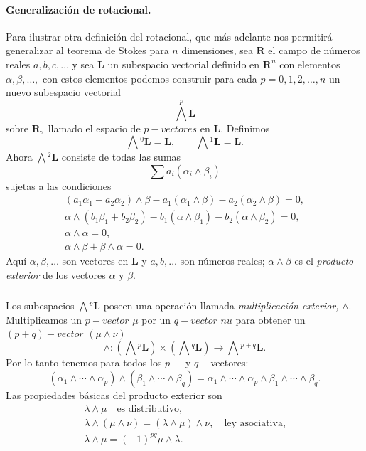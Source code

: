 \documentclass{article}
\theoremstyle{definition} \newtheorem{defi}{Definici\'on}
\theoremstyle{definition} \newtheorem{teo}{Teorema}
\theoremstyle{definition} \newtheorem{cor}{Corolario}
\begin{document}
\paragraph{Generalizaci\'on de rotacional.}
Para ilustrar otra definici\'on del rotacional, que m\'as adelante nos permitir\'a generalizar al teorema de Stokes para $n$ dimensiones, sea $\mathbf{R}$ el campo de n\'umeros reales $a,b,c,\dots$ y sea $\mathbf{L}$ un subespacio vectorial definido en $\mathbf{R}^n$ con elementos $\alpha,\beta,\dots,$ con estos elementos podemos construir para cada $p=0,1,2,\dots,n$ un nuevo subespacio vectorial
$$\bigwedge ^p \mathbf{L}$$
sobre $\mathbf{R},$ llamado el espacio de $p-vectores$ en $\mathbf{L}.$ Definimos
$$\bigwedge{^0} \mathbf{L}= \mathbf{L}, \qquad \bigwedge{^1} \mathbf{L} = \mathbf{L.}$$
Ahora $\bigwedge{^2} \mathbf{L}$ consiste de todas las sumas
$$\sum a_i\left(\alpha_i \wedge \beta_i\right)$$
sujetas a las condiciones
\begin{align*}
(a_1\alpha_1+a_2\alpha_2) \wedge \beta -a_1(\alpha_1 \wedge \beta ) -a_2(\alpha_2 \wedge \beta) = 0,\\
\alpha \wedge (b_1\beta_1 + b_2\beta_2) - b_1(\alpha \wedge \beta_1) - b_2(\alpha \wedge \beta_2) = 0,\\
\alpha \wedge \alpha = 0,\\
\alpha \wedge \beta + \beta \wedge \alpha =0.
\end{align*}
Aqu\'i $\alpha,\beta,\dots$ son vectores en $\mathbf{L}$ y $a,b,\dots$ son n\'umeros reales; $\alpha \wedge \beta$ es el \emph{producto exterior} de los vectores $\alpha$ y $\beta.$
\subparagraph{}
Los subespacios $\bigwedge{^p} \mathbf{L}$ poseen una operaci\'on llamada \emph{multiplicaci\'on exterior,} $\wedge.$ Multiplicamos un $p-vector$ $\mu$ por un $q-vector$ $nu$ para obtener un $(p+q)-vector$ $(\mu \wedge \nu)$
\begin{equation*}
\wedge : \left(\bigwedge{^p} \mathbf{L}\right) \times \left(\bigwedge{^q} \mathbf{L}\right) \rightarrow \bigwedge{^{p+q}}\mathbf{L}.
\end{equation*}
Por lo tanto tenemos para todos los $p-$ y $q-$vectores:
$$(\alpha_1\wedge\cdots\wedge\alpha_p)\wedge(\beta_1\wedge\cdots\wedge\beta_q)=\alpha_1\wedge\cdots\wedge\alpha_p\wedge\beta_1\wedge\cdots\wedge\beta_q.$$
Las propiedades b\'asicas del producto exterior son
\begin{align*}
\lambda \wedge \mu \quad \text{es distributivo,}\\
\lambda \wedge (\mu \wedge \nu)=(\lambda \wedge \mu) \wedge \nu, \quad \text{ley asociativa,}\\
\lambda \wedge \mu=(-1)^{pq}\mu \wedge \lambda.
\end{align*}
\end{document}
